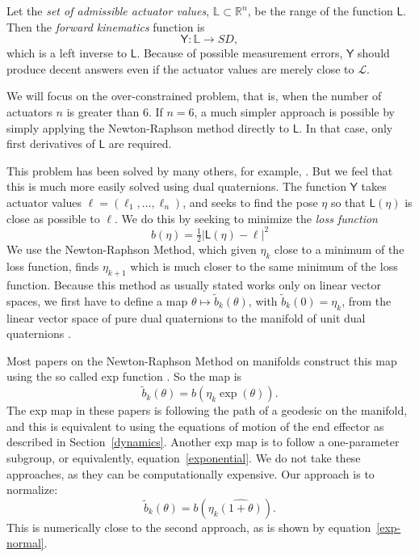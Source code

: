 \documentclass[reqno,12pt]{amsart}
\newcommand\setunitdualquat{SD}
\begin{document}
Let the \emph{set of admissible actuator values}, $\mathbb L \subset \mathbb R^n$, be the range of the function $\mathsf L$.  Then the \emph{forward kinematics} function is
\begin{equation}
\mathsf Y : \mathbb L \to \setunitdualquat,
\end{equation}
 which is a left inverse to $\mathsf L$.  Because of possible measurement errors, $\mathsf Y$ should produce decent answers even if the actuator values are merely close to $\mathcal L$.  

We will focus on the over-constrained problem, that is, when the number of actuators $n$ is greater than $6$.  If $n = 6$, a much simpler approach is possible by simply applying the Newton-Raphson method directly to $\mathsf L$.  In that case, only first derivatives of $\mathsf L$ are required.

This problem has been solved by many others, for example, \cite{pott-schmidt,yang-et-al}.  But we feel that this is much more easily solved using dual quaternions.
The function $\mathsf Y$ takes actuator values $\bm\ell = (\ell_1,\dots,\ell_n)$, and seeks to find the pose $\eta$ so that $\mathsf L(\eta)$ is close as possible to $\bm\ell$.  We do this by seeking to minimize the \emph{loss function}
\begin{equation}
b(\eta) = \tfrac12 {|\mathsf L(\eta) - \bm\ell|}^2
\end{equation}
We use the Newton-Raphson Method, which given $\eta_k$ close to a minimum of the loss function, finds $\eta_{k+1}$ which is much closer to the same minimum of the loss function.  Because this method as usually stated works only on linear vector spaces, we first have to define a map $\theta\mapsto\tilde b_k(\theta)$, with $\tilde b_k(0) = \eta_k$, from the linear vector space of pure dual quaternions to the manifold of unit dual quaternions \cite{huper-trumpf}.

Most papers on the Newton-Raphson Method on manifolds construct this map using the so called exp function \cite{dedieu-et-al,fernandes-et-al,ferreira-svaiter}.  So the map is
\begin{equation}
\tilde b_k(\theta) = b(\eta_k \exp(\theta)).
\end{equation}
The exp map in these papers is following the path of a geodesic on the manifold, and this is equivalent to using the equations of motion of the end effector as described in Section~\ref{dynamics}.  Another exp map is to follow a one-parameter subgroup, or equivalently, equation~\eqref{exponential}.  We do not take these approaches, as they can be computationally expensive.  Our approach is to normalize:
\begin{equation}
\tilde b_k(\theta) = b(\eta_k  \widehat{(1 + \theta)}).
\end{equation}
This is numerically close to the second approach, as is shown by equation~\eqref{exp-normal}.
\end{document}
